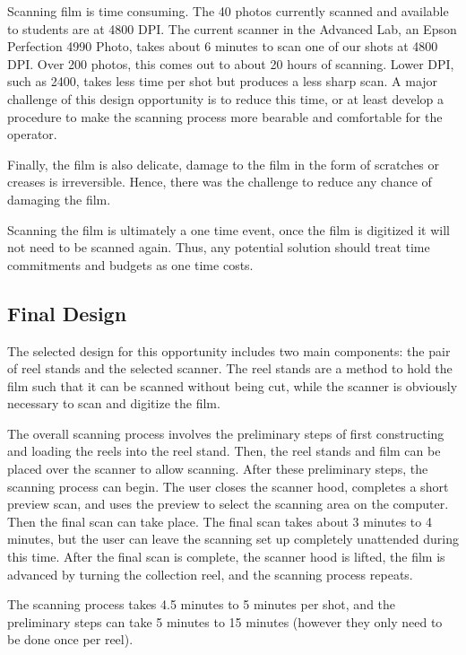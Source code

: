 \documentclass[12pt]{article} %
\begin{document}
Scanning film is time consuming. The 40 photos currently scanned and available to students are at 4800 DPI. The current scanner in the Advanced Lab, an Epson Perfection 4990 Photo, takes about 6 minutes to scan one of our shots at 4800 DPI. Over 200 photos, this comes out to about 20 hours of scanning. Lower DPI, such as 2400, takes less time per shot but produces a less sharp scan. A major challenge of this design opportunity is to reduce this time, or at least develop a procedure to make the scanning process more bearable and comfortable for the operator.

Finally, the film is also delicate, damage to the film in the form of scratches or creases is irreversible. Hence, there was the challenge to reduce any chance of damaging the film.

Scanning the film is ultimately a one time event, once the film is digitized it will not need to be scanned again. Thus, any potential solution should treat time commitments and budgets as one time costs.

\subsection{Final Design}
The selected design for this opportunity includes two main components: the pair of reel stands and the selected scanner. The reel stands are a method to hold the film such that it can be scanned without being cut, while the scanner is obviously necessary to scan and digitize the film.

The overall scanning process involves the preliminary steps of first constructing and loading the reels into the reel stand. Then, the reel stands and film can be placed over the scanner to allow scanning. After these preliminary steps, the scanning process can begin. The user closes the scanner hood, completes a short preview scan, and uses the preview to select the scanning area on the computer. Then the final scan can take place. The final scan takes about 3 minutes to 4 minutes, but the user can leave the scanning set up completely unattended during this time. After the final scan is complete, the scanner hood is lifted, the film is advanced by turning the collection reel, and the scanning process repeats. 

The scanning process takes 4.5 minutes to 5 minutes per shot, and the preliminary steps can take 5 minutes to 15 minutes (however they only need to be done once per reel).
\end{document}
